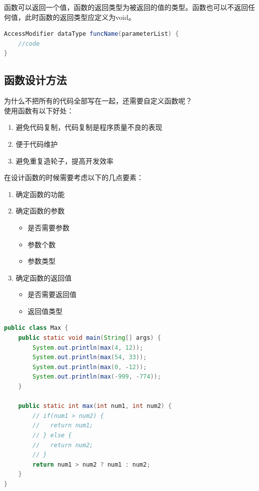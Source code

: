 函数可以返回一个值，函数的返回类型为被返回的值的类型。函数也可以不返回任何值，此时函数的返回类型应定义为void。

\begin{lstlisting}[language=Java]
AccessModifier dataType funcName(parameterList) {
	//code
}
\end{lstlisting}

\vspace{0.5cm}

\subsection{函数设计方法}

为什么不把所有的代码全部写在一起，还需要自定义函数呢？\\

使用函数有以下好处：

\begin{enumerate}
	\item 避免代码复制，代码复制是程序质量不良的表现
	\item 便于代码维护
	\item 避免重复造轮子，提高开发效率
\end{enumerate}

在设计函数的时候需要考虑以下的几点要素：

\begin{enumerate}
	\item 确定函数的功能

	\item 确定函数的参数
	      \begin{itemize}
		      \item 是否需要参数
		      \item 参数个数
		      \item 参数类型
	      \end{itemize}

	\item 确定函数的返回值
	      \begin{itemize}
		      \item 是否需要返回值
		      \item 返回值类型
	      \end{itemize}
\end{enumerate}


\begin{lstlisting}[language=Java]
public class Max {
	public static void main(String[] args) {
		System.out.println(max(4, 12));
		System.out.println(max(54, 33));
		System.out.println(max(0, -12));
		System.out.println(max(-999, -774));
	}

	public static int max(int num1, int num2) {
		// if(num1 > num2) {
		//	 return num1;
		// } else {
		//	 return num2;
		// }
		return num1 > num2 ? num1 : num2;
	}
}
\end{lstlisting}

